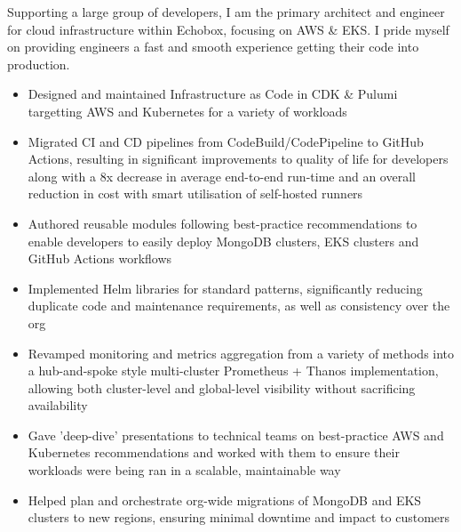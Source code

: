 \documentclass[10pt,a4paper,ragged2e]{altacv}
\begin{document}

\begin{fullwidth}
\makecvheader
\end{fullwidth}




Supporting a large group of developers, I am the primary architect and engineer for cloud infrastructure within Echobox, focusing on AWS \& EKS. I pride myself on providing engineers a fast and smooth experience getting their code into production.
\smallskip
\begin{itemize}
  \item Designed and maintained Infrastructure as Code in CDK \& Pulumi targetting AWS and Kubernetes for a variety of workloads
  \item Migrated CI and CD pipelines from CodeBuild/CodePipeline to GitHub Actions, resulting in significant improvements to quality of life for developers along with a 8x decrease in average end-to-end run-time and an overall reduction in cost with smart utilisation of self-hosted runners
  \item Authored reusable modules following best-practice recommendations to enable developers to easily deploy MongoDB clusters, EKS clusters and GitHub Actions workflows
  \item Implemented Helm libraries for standard patterns, significantly reducing duplicate code and maintenance requirements, as well as consistency over the org
  \item Revamped monitoring and metrics aggregation from a variety of methods into a hub-and-spoke style multi-cluster Prometheus + Thanos implementation, allowing both cluster-level and global-level visibility without sacrificing availability
  \item Gave 'deep-dive' presentations to technical teams on best-practice AWS and Kubernetes recommendations and worked with them to ensure their workloads were being ran in a scalable, maintainable way
  \item Helped plan and orchestrate org-wide migrations of MongoDB and EKS clusters to new regions, ensuring minimal downtime and impact to customers
\end{itemize}
\end{document}
